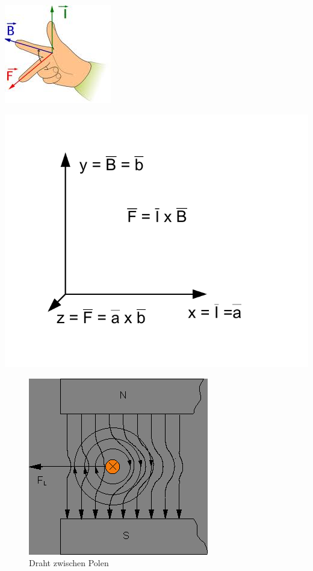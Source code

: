 \documentclass[a4paper]{scrartcl}
\begin{document}
\begin{center}
\includegraphics[scale=0.5]{images/handregel.jpg}
\end{center}

\begin{center}
\includegraphics[scale=0.5]{images/kreuzprodukt.pdf}
\label{fig:kreuzprodukt}
\end{center}


\begin{figure}[h!]
\begin{center}
\includegraphics[scale=0.5]{images/DrahtZwischenPolen.png}
\caption{Draht zwischen Polen}
\label{fig:DrahtZwischenPolen}
\end{center}
\end{figure}
\end{document}
